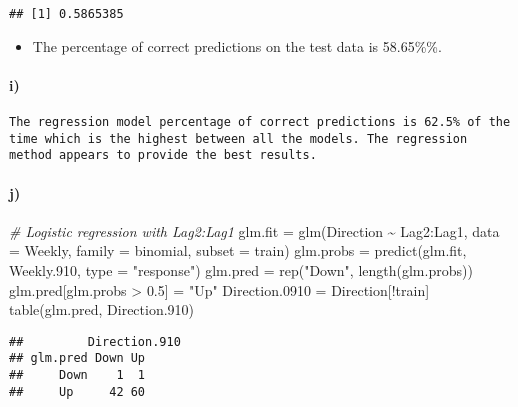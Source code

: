 \documentclass[
]{article}
\newenvironment{Shaded}{\begin{snugshade}}{\end{snugshade}}
\newcommand{\AttributeTok}[1]{\textcolor[rgb]{0.77,0.63,0.00}{#1}}
\newcommand{\CommentTok}[1]{\textcolor[rgb]{0.56,0.35,0.01}{\textit{#1}}}
\newcommand{\FloatTok}[1]{\textcolor[rgb]{0.00,0.00,0.81}{#1}}
\newcommand{\FunctionTok}[1]{\textcolor[rgb]{0.00,0.00,0.00}{#1}}
\newcommand{\NormalTok}[1]{#1}
\newcommand{\OtherTok}[1]{\textcolor[rgb]{0.56,0.35,0.01}{#1}}
\newcommand{\SpecialCharTok}[1]{\textcolor[rgb]{0.00,0.00,0.00}{#1}}
\newcommand{\StringTok}[1]{\textcolor[rgb]{0.31,0.60,0.02}{#1}}
\providecommand{\tightlist}{%
  \setlength{\itemsep}{0pt}\setlength{\parskip}{0pt}}
\begin{document}
\begin{verbatim}
## [1] 0.5865385
\end{verbatim}

\begin{itemize}
\tightlist
\item
  The percentage of correct predictions on the test data is 58.65\%\%.
\end{itemize}

\hypertarget{i}{%
\paragraph{i)}\label{i}}

\begin{verbatim}
The regression model percentage of correct predictions is 62.5% of the time which is the highest between all the models. The regression method appears to provide the best results.      
\end{verbatim}

\hypertarget{j}{%
\paragraph{j)}\label{j}}

\begin{Shaded}
\begin{Highlighting}[]
\CommentTok{\# Logistic regression with Lag2:Lag1}
\NormalTok{glm.fit }\OtherTok{=} \FunctionTok{glm}\NormalTok{(Direction }\SpecialCharTok{\textasciitilde{}}\NormalTok{ Lag2}\SpecialCharTok{:}\NormalTok{Lag1, }\AttributeTok{data =}\NormalTok{ Weekly, }\AttributeTok{family =}\NormalTok{ binomial, }\AttributeTok{subset =}\NormalTok{ train)}
\NormalTok{glm.probs }\OtherTok{=} \FunctionTok{predict}\NormalTok{(glm.fit, Weekly}\FloatTok{.910}\NormalTok{, }\AttributeTok{type =} \StringTok{"response"}\NormalTok{)}
\NormalTok{glm.pred }\OtherTok{=} \FunctionTok{rep}\NormalTok{(}\StringTok{"Down"}\NormalTok{, }\FunctionTok{length}\NormalTok{(glm.probs))}
\NormalTok{glm.pred[glm.probs }\SpecialCharTok{\textgreater{}} \FloatTok{0.5}\NormalTok{] }\OtherTok{=} \StringTok{"Up"}
\NormalTok{Direction}\FloatTok{.0910} \OtherTok{=}\NormalTok{ Direction[}\SpecialCharTok{!}\NormalTok{train]}
\FunctionTok{table}\NormalTok{(glm.pred, Direction}\FloatTok{.910}\NormalTok{)}
\end{Highlighting}
\end{Shaded}

\begin{verbatim}
##         Direction.910
## glm.pred Down Up
##     Down    1  1
##     Up     42 60
\end{verbatim}
\end{document}
